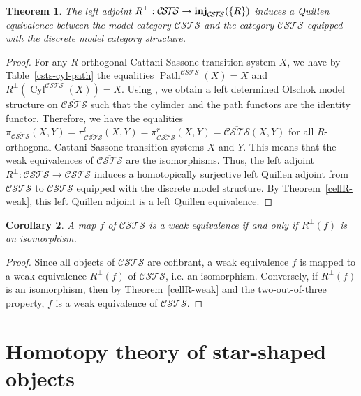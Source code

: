 \documentclass[a4paper,12pt]{amsart}
\newtheorem{thm}{Theorem}[section]
\newtheorem{cor}[thm]{Corollary}
\begin{document}
\begin{thm} \label{description-csts} The left adjoint $R^\perp:{\mathcal{C\!S\!T\!S}} \to
\operatorname{{{\rm{\mathbf{{inj}}}}}}_{\mathcal{C\!S\!T\!S}}(\{R\})$ induces a Quillen equivalence between the model
category ${\mathcal{C\!S\!T\!S}}$ and the category $\overline{\mathcal{C\!S\!T\!S}}$ equipped with the
discrete model category structure. \end{thm}

\begin{proof} For any $R$-orthogonal Cattani-Sassone transition system $X$, we
have by Table~\ref{csts-cyl-path} the equalities $\operatorname{{Path}}^{\mathcal{C\!S\!T\!S}}(X)=X$
and $R^\perp(\operatorname{{Cyl}}^{\mathcal{C\!S\!T\!S}}(X))=X$. Using \cite[Theorem~3.1]{leftdet}, we
obtain a left determined Olschok model structure on $\overline{\mathcal{C\!S\!T\!S}}$
such that the cylinder and the path functors are the identity
functor. Therefore, we have the equalities
$\pi_{\overline{\mathcal{C\!S\!T\!S}}}(X,Y) = \pi^l_{\overline{\mathcal{C\!S\!T\!S}}}(X,Y) =
\pi^r_{\overline{\mathcal{C\!S\!T\!S}}}(X,Y) = \overline{\mathcal{C\!S\!T\!S}}(X,Y)$ for all
$R$-orthogonal Cattani-Sassone transition systems $X$ and $Y$. This
means that the weak equivalences of $\overline{\mathcal{C\!S\!T\!S}}$ are the
isomorphisms.  Thus, the left adjoint $R^\perp:{\mathcal{C\!S\!T\!S}} \to
\overline{\mathcal{C\!S\!T\!S}}$ induces a homotopically surjective left Quillen
adjoint from ${\mathcal{C\!S\!T\!S}}$ to $\overline{\mathcal{C\!S\!T\!S}}$ equipped with the discrete
model structure.  By Theorem~\ref{cellR-weak}, this left Quillen
adjoint is a left Quillen equivalence.  \end{proof}

\begin{cor} \label{w1} A map $f$ of ${\mathcal{C\!S\!T\!S}}$ is a weak equivalence if
  and only if $R^\perp(f)$ is an isomorphism. \end{cor}

\begin{proof} Since all objects of ${\mathcal{C\!S\!T\!S}}$ are cofibrant, a weak equivalence
$f$ is mapped to a weak equivalence $R^\perp(f)$ of
$\overline{\mathcal{C\!S\!T\!S}}$, i.e. an isomorphism.  Conversely, if $R^\perp(f)$
is an isomorphism, then by Theorem~\ref{cellR-weak} and the
two-out-of-three property, $f$ is a weak equivalence of ${\mathcal{C\!S\!T\!S}}$.  \end{proof}

\section{Homotopy theory of star-shaped objects}
\label{model-bullet}
\end{document}
